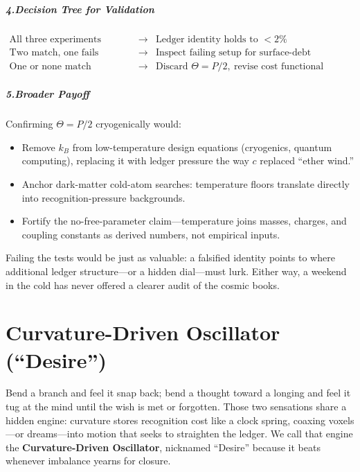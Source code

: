 \documentclass[11pt,oneside]{book}
\begin{document}
\paragraph*{4.\;Decision Tree for Validation}

\[
  \begin{array}{rcl}
  \text{All three experiments match} &\to& \text{Ledger identity holds to }<2\% \\
  \text{Two match, one fails} &\to& \text{Inspect failing setup for surface-debt artefacts} \\
  \text{One or none match} &\to& \text{Discard }\Theta = P/2,\ \text{revise cost functional}
  \end{array}
\]

\paragraph*{5.\;Broader Payoff}

Confirming \(\Theta = P/2\) cryogenically would:

\begin{itemize}
\item Remove \(k_B\) from low-temperature design equations (cryogenics, quantum computing), replacing it with ledger pressure the way \(c\) replaced “ether wind.”
\item Anchor dark-matter cold-atom searches: temperature floors translate directly into recognition-pressure backgrounds.
\item Fortify the no-free-parameter claim—temperature joins masses, charges, and coupling constants as derived numbers, not empirical inputs.
\end{itemize}

Failing the tests would be just as valuable: a falsified identity points to where additional ledger structure—or a hidden dial—must lurk.  
Either way, a weekend in the cold has never offered a clearer audit of the cosmic books.

\chapter{Curvature-Driven Oscillator (“Desire”)}
\label{chap:curvature-oscillator}

Bend a branch and feel it snap back; bend a thought toward a longing and feel it tug at the mind until the wish is met or forgotten.  
Those two sensations share a hidden engine: curvature stores recognition cost like a clock spring, coaxing voxels—or dreams—into motion that seeks to straighten the ledger.  
We call that engine the \textbf{Curvature-Driven Oscillator}, nicknamed “Desire” because it beats whenever imbalance yearns for closure.
\end{document}
